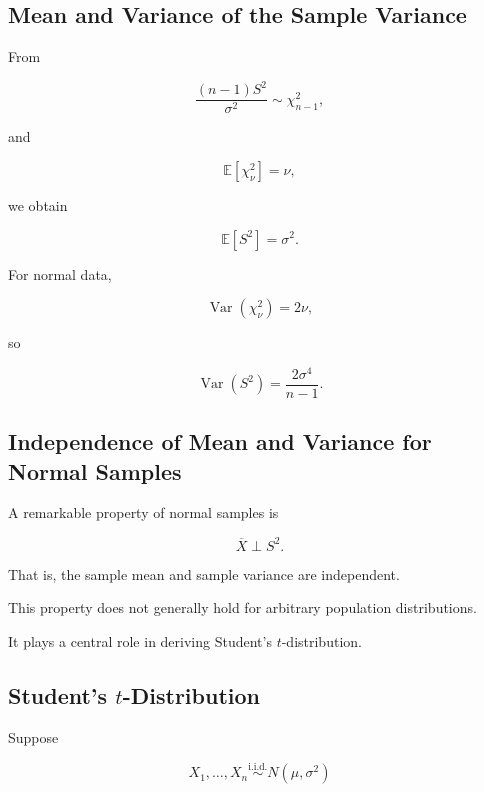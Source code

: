 \subsection{Mean and Variance of the Sample Variance}
\label{subsec:mean-variance-sample-variance}

From

\[
\frac{
(n-1)S^2
}{
\sigma^2
}
\sim
\chi^2_{n-1},
\]

and

\[
\mathbb{E}[\chi^2_\nu]=\nu,
\]

we obtain

\[
\boxed{
\mathbb{E}[S^2]
=
\sigma^2.
}
\]

For normal data,

\[
\operatorname{Var}(\chi^2_\nu)=2\nu,
\]

so

\[
\boxed{
\operatorname{Var}(S^2)
=
\frac{
2\sigma^4
}{
n-1
}.
}
\]

\subsection{Independence of Mean and Variance for Normal Samples}
\label{subsec:mean-variance-independence-normal}

A remarkable property of normal samples is

\[
\boxed{
\overline{X}
\perp
S^2.
}
\]

That is, the sample mean and sample variance are independent.

This property does not generally hold for arbitrary population
distributions.

It plays a central role in deriving Student's \(t\)-distribution.

\subsection{Student's \(t\)-Distribution}
\label{subsec:students-t-sampling}

Suppose

\[
X_1,\ldots,X_n
\overset{\text{i.i.d.}}{\sim}
N(\mu,\sigma^2)
\]

